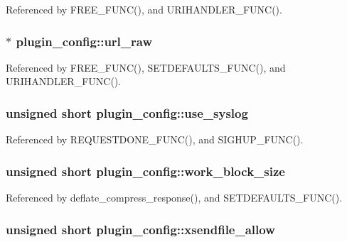 Referenced by F\-R\-E\-E\-\_\-\-F\-U\-N\-C(), and U\-R\-I\-H\-A\-N\-D\-L\-E\-R\-\_\-\-F\-U\-N\-C().

\hypertarget{structplugin__config_af3c48c353a694adcc243fe95fd53f9d7}{
\subsubsection[{url\-\_\-raw}]{$\ast$ plugin\-\_\-config\-::url\-\_\-raw}}\label{structplugin__config_af3c48c353a694adcc243fe95fd53f9d7}


Referenced by F\-R\-E\-E\-\_\-\-F\-U\-N\-C(), S\-E\-T\-D\-E\-F\-A\-U\-L\-T\-S\-\_\-\-F\-U\-N\-C(), and U\-R\-I\-H\-A\-N\-D\-L\-E\-R\-\_\-\-F\-U\-N\-C().

\hypertarget{structplugin__config_a0550af5388be0c53c8e7d608ab13223a}{
\subsubsection[{use\-\_\-syslog}]{\setlength{\rightskip}{0pt plus 5cm}unsigned short plugin\-\_\-config\-::use\-\_\-syslog}}\label{structplugin__config_a0550af5388be0c53c8e7d608ab13223a}


Referenced by R\-E\-Q\-U\-E\-S\-T\-D\-O\-N\-E\-\_\-\-F\-U\-N\-C(), and S\-I\-G\-H\-U\-P\-\_\-\-F\-U\-N\-C().

\hypertarget{structplugin__config_ae9d80653853b7571ce08b5c358bf8853}{
\subsubsection[{work\-\_\-block\-\_\-size}]{\setlength{\rightskip}{0pt plus 5cm}unsigned short plugin\-\_\-config\-::work\-\_\-block\-\_\-size}}\label{structplugin__config_ae9d80653853b7571ce08b5c358bf8853}


Referenced by deflate\-\_\-compress\-\_\-response(), and S\-E\-T\-D\-E\-F\-A\-U\-L\-T\-S\-\_\-\-F\-U\-N\-C().

\hypertarget{structplugin__config_a5bbbfcc87c33eefe362863674f108d79}{
\subsubsection[{xsendfile\-\_\-allow}]{\setlength{\rightskip}{0pt plus 5cm}unsigned short plugin\-\_\-config\-::xsendfile\-\_\-allow}}\label{structplugin__config_a5bbbfcc87c33eefe362863674f108d79}


